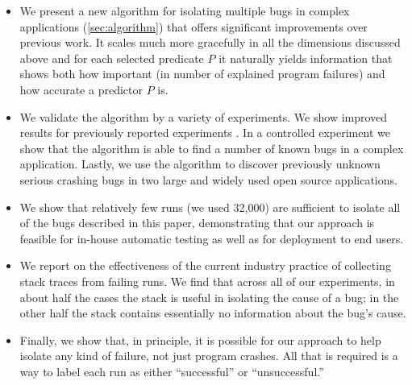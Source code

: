 \documentclass[preprint,final]{sigplanconf}
\begin{document}
\begin{itemize}

\item We present a new algorithm for isolating multiple bugs in
complex applications (\autoref{sec:algorithm})
that offers significant improvements over previous work.
It scales much more gracefully in all the dimensions discussed above
and for each selected predicate $P$ it naturally yields information
that shows both how important (in number of explained program
failures) and how accurate a predictor $P$ is.

\item We validate the algorithm by a variety of experiments.  We show
improved results for previously reported experiments
\cite{PLDI`03*141}.  In a
controlled experiment we show that the algorithm is able to find a
number of known bugs in a complex application.  Lastly, we use
the algorithm to discover previously unknown serious crashing bugs in
two large and widely used open source applications.

\item We show that relatively few runs (we used 32,000) are sufficient
to isolate all of the bugs described in this paper, demonstrating that our
approach is feasible for in-house automatic testing as well as for
deployment to end users.

\item We report on the effectiveness of the current industry practice
of collecting stack traces from failing runs.  We find that across all
of our experiments, in about half the cases the stack is useful in
isolating the cause of a bug; in the other half the stack contains
essentially no information about the bug's cause.

\item Finally, we show that, in principle, it is possible for our
approach to help isolate any kind of failure, not just program
crashes.  All that is required is a way to label each run as either
``successful'' or ``unsuccessful.''

\end{itemize}
\end{document}
